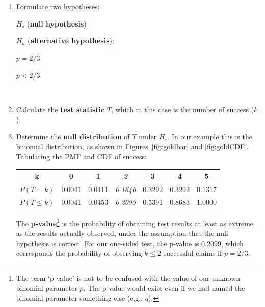 \begin{enumerate}

\item Formulate two hypotheses:\\

\noindent\begin{minipage}{.4\textwidth}
  $H_\circ$ (\textbf{null hypothesis})
  
  \vspace{1em}
  
  $H_a$ (\textbf{alternative hypothesis}):
\end{minipage}
\begin{minipage}{.2\textwidth}
\end{minipage}
\begin{minipage}{.2\textwidth}
  $p={2/3}$
  
  \vspace{1em}
  
  $p<{2/3}$
\end{minipage}
\begin{minipage}{.2\textwidth}
\end{minipage}\\

\item Calculate the \textbf{test statistic} $T$, which in this case is
  the number of success ($k$).

\item Determine the \textbf{null distribution} of $T$ under
  $H_\circ$. In our example this is the binomial distribution, as
  shown in Figures~\ref{fig:goldbar} and \ref{fig:goldCDF}. Tabulating
  the PMF and CDF of success:

  \begin{center}
  \begin{tabular}{ccccccc}
    k & 0 & 1 & \textit{2} & 3 & 4 & 5 \\ \hline
    $P(T=k)$ & 0.0041 & 0.0411 & \textit{0.1646} & 0.3292 & 0.3292 & 0.1317 \\
    $P({T}\leq{k})$ & 0.0041 & 0.0453 & \textit{0.2099} & 0.5391 & 0.8683 & 1.0000
  \end{tabular}
  \end{center}


The \textbf{p-value}\footnote{The term `p-value' is not to be confused
  with the value of our unknown binomial parameter $p$. The p-value
  would exist even if we had named the binomial parameter something
  else (e.g., $q$).} is the probability of obtaining test results at
least as extreme as the results actually observed, under the
assumption that the null hypothesis is correct. For our one-sided
test, the p-value is 0.2099, which corresponds the probability of
observing $k\leq{2}$ successful claims if $p=2/3$.
  

\end{enumerate}
